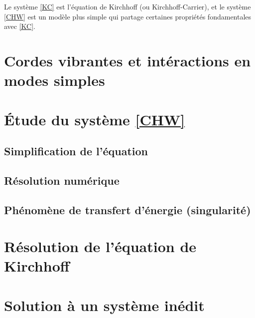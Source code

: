\documentclass[10pt,a4paper]{article}
\begin{document}
Le système \eqref{KC} est l'équation de Kirchhoff (ou Kirchhoff-Carrier), et le système \eqref{CHW} est un modèle plus simple qui partage certaines propriétés fondamentales avec \eqref{KC}.


\section{Cordes vibrantes et intéractions en modes simples}

\section{Étude du système \eqref{CHW}}

\subsection{Simplification de l'équation}

\subsection{Résolution numérique}
\subsection{Phénomène de transfert d'énergie (singularité)}
\section{Résolution de l'équation de Kirchhoff}
\section{Solution à un système inédit}
\end{document}
